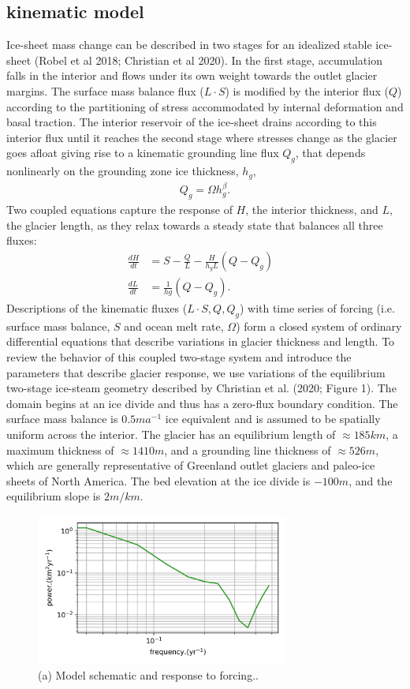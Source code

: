 \documentclass[tc, manuscript]{copernicus}
\begin{document}
\subsection{kinematic model}

Ice-sheet mass change can be described in two stages for an idealized stable ice-sheet (Robel et al 2018; Christian et al 2020).
In the first stage, accumulation falls in the interior and flows under its own weight towards the outlet glacier margins.
The surface mass balance flux ($L\cdot S$) is modified by the interior flux ($Q$) according to the partitioning of stress accommodated by internal deformation and basal traction.
The interior reservoir of the ice-sheet drains according to this interior flux until it reaches the second stage where stresses change as the glacier goes afloat giving rise to a kinematic grounding line flux $Q_g$, that depends nonlinearly on the grounding zone ice thickness, $h_g$,
\begin{align}
Q_g=\Omega h_g^\beta.
\end{align}
 Two coupled equations capture the response of $H$, the interior thickness, and $L$, the glacier length, as they relax towards a steady state that balances all three fluxes:
 \begin{align}
\frac{dH}{dt} &=S - \frac{Q}{L}-\frac{H}{h_g L}(Q-Q_g)&\\
\frac{dL}{dt} &=\frac{1}{hg}(Q-Q_g).&
\end{align}
Descriptions of the kinematic fluxes ($L\cdot S, Q, Q_g$) with time series of forcing (i.e. surface mass balance, $S$ and ocean melt rate, $\Omega$) form a closed system of ordinary differential equations that describe variations in glacier thickness and length.
To review the behavior of this coupled two-stage system and introduce the parameters that describe glacier response, we use variations of the equilibrium two-stage ice-steam geometry described by Christian et al. (2020; Figure 1).
The domain begins at an ice divide and thus has a zero-flux boundary condition.
The surface mass balance is $0.5 m a^{-1}$ ice equivalent and is assumed to be spatially uniform across the interior.
The glacier has an equilibrium length of $\approx185km$, a maximum thickness of $\approx1410m$, and a grounding line thickness of $\approx 526m$, which are generally representative of Greenland outlet glaciers and paleo-ice sheets of North America.
The bed elevation at the ice divide is $-100m$, and the equilibrium slope is $2m/km$. 

\begin{figure}[t]
\includegraphics[width=8.3cm]{../figures/simulation0203.png}
\caption{(a) Model schematic and response to forcing..}
\end{figure}
\end{document}
